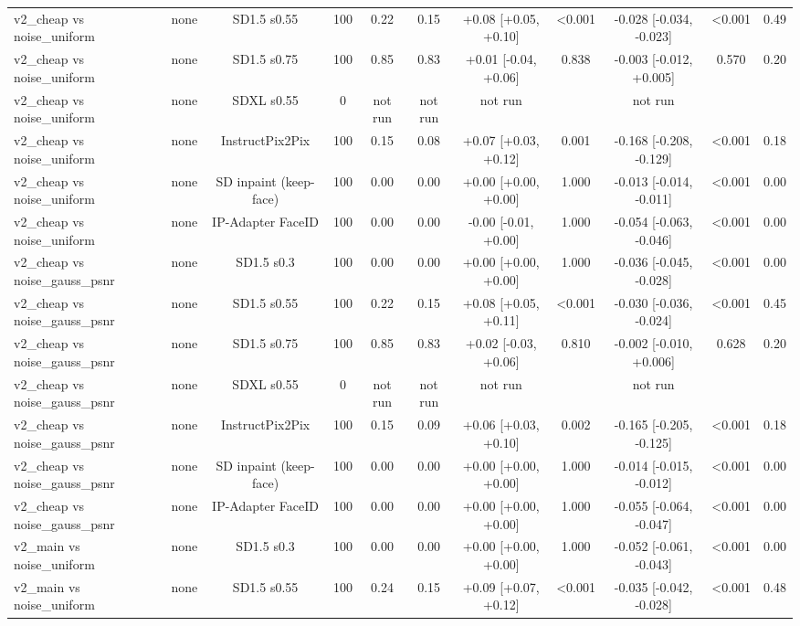 \begin{table}[t]
{\begin{tabular}{lcccccccccc}
v2\_cheap vs noise\_uniform & none & SD1.5 s0.55 & 100 & 0.22 & 0.15 & +0.08 [+0.05, +0.10] & <0.001 & -0.028 [-0.034, -0.023] & <0.001 & 0.49 \\
v2\_cheap vs noise\_uniform & none & SD1.5 s0.75 & 100 & 0.85 & 0.83 & +0.01 [-0.04, +0.06] & 0.838 & -0.003 [-0.012, +0.005] & 0.570 & 0.20 \\
v2\_cheap vs noise\_uniform & none & SDXL s0.55 & 0 & not run & not run & not run &  & not run &  &  \\
v2\_cheap vs noise\_uniform & none & InstructPix2Pix & 100 & 0.15 & 0.08 & +0.07 [+0.03, +0.12] & 0.001 & -0.168 [-0.208, -0.129] & <0.001 & 0.18 \\
v2\_cheap vs noise\_uniform & none & SD inpaint (keep-face) & 100 & 0.00 & 0.00 & +0.00 [+0.00, +0.00] & 1.000 & -0.013 [-0.014, -0.011] & <0.001 & 0.00 \\
v2\_cheap vs noise\_uniform & none & IP-Adapter FaceID & 100 & 0.00 & 0.00 & -0.00 [-0.01, +0.00] & 1.000 & -0.054 [-0.063, -0.046] & <0.001 & 0.00 \\
v2\_cheap vs noise\_gauss\_psnr & none & SD1.5 s0.3 & 100 & 0.00 & 0.00 & +0.00 [+0.00, +0.00] & 1.000 & -0.036 [-0.045, -0.028] & <0.001 & 0.00 \\
v2\_cheap vs noise\_gauss\_psnr & none & SD1.5 s0.55 & 100 & 0.22 & 0.15 & +0.08 [+0.05, +0.11] & <0.001 & -0.030 [-0.036, -0.024] & <0.001 & 0.45 \\
v2\_cheap vs noise\_gauss\_psnr & none & SD1.5 s0.75 & 100 & 0.85 & 0.83 & +0.02 [-0.03, +0.06] & 0.810 & -0.002 [-0.010, +0.006] & 0.628 & 0.20 \\
v2\_cheap vs noise\_gauss\_psnr & none & SDXL s0.55 & 0 & not run & not run & not run &  & not run &  &  \\
v2\_cheap vs noise\_gauss\_psnr & none & InstructPix2Pix & 100 & 0.15 & 0.09 & +0.06 [+0.03, +0.10] & 0.002 & -0.165 [-0.205, -0.125] & <0.001 & 0.18 \\
v2\_cheap vs noise\_gauss\_psnr & none & SD inpaint (keep-face) & 100 & 0.00 & 0.00 & +0.00 [+0.00, +0.00] & 1.000 & -0.014 [-0.015, -0.012] & <0.001 & 0.00 \\
v2\_cheap vs noise\_gauss\_psnr & none & IP-Adapter FaceID & 100 & 0.00 & 0.00 & +0.00 [+0.00, +0.00] & 1.000 & -0.055 [-0.064, -0.047] & <0.001 & 0.00 \\
v2\_main vs noise\_uniform & none & SD1.5 s0.3 & 100 & 0.00 & 0.00 & +0.00 [+0.00, +0.00] & 1.000 & -0.052 [-0.061, -0.043] & <0.001 & 0.00 \\
v2\_main vs noise\_uniform & none & SD1.5 s0.55 & 100 & 0.24 & 0.15 & +0.09 [+0.07, +0.12] & <0.001 & -0.035 [-0.042, -0.028] & <0.001 & 0.48 \\

\end{tabular}}
\end{table}
